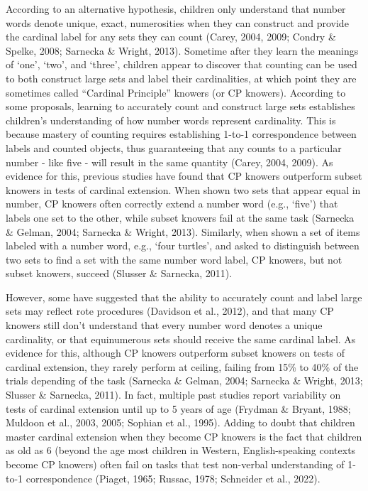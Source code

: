 \documentclass[10pt, letterpaper]{article}
\begin{document}
According to an alternative hypothesis, children only understand that
number words denote unique, exact, numerosities when they can construct
and provide the cardinal label for any sets they can count (Carey, 2004,
2009; Condry \& Spelke, 2008; Sarnecka \& Wright, 2013). Sometime after
they learn the meanings of `one', `two', and `three', children appear to
discover that counting can be used to both construct large sets and
label their cardinalities, at which point they are sometimes called
``Cardinal Principle'' knowers (or CP knowers). According to some
proposals, learning to accurately count and construct large sets
establishes children's understanding of how number words represent
cardinality. This is because mastery of counting requires establishing
1-to-1 correspondence between labels and counted objects, thus
guaranteeing that any counts to a particular number - like five - will
result in the same quantity (Carey, 2004, 2009). As evidence for this,
previous studies have found that CP knowers outperform subset knowers in
tests of cardinal extension. When shown two sets that appear equal in
number, CP knowers often correctly extend a number word (e.g., `five')
that labels one set to the other, while subset knowers fail at the same
task (Sarnecka \& Gelman, 2004; Sarnecka \& Wright, 2013). Similarly,
when shown a set of items labeled with a number word, e.g., `four
turtles', and asked to distinguish between two sets to find a set with
the same number word label, CP knowers, but not subset knowers, succeed
(Slusser \& Sarnecka, 2011).

However, some have suggested that the ability to accurately count and
label large sets may reflect rote procedures (Davidson et al., 2012),
and that many CP knowers still don't understand that every number word
denotes a unique cardinality, or that equinumerous sets should receive
the same cardinal label. As evidence for this, although CP knowers
outperform subset knowers on tests of cardinal extension, they rarely
perform at ceiling, failing from 15\% to 40\% of the trials depending of
the task (Sarnecka \& Gelman, 2004; Sarnecka \& Wright, 2013; Slusser \&
Sarnecka, 2011). In fact, multiple past studies report variability on
tests of cardinal extension until up to 5 years of age (Frydman \&
Bryant, 1988; Muldoon et al., 2003, 2005; Sophian et al., 1995). Adding
to doubt that children master cardinal extension when they become CP
knowers is the fact that children as old as 6 (beyond the age most
children in Western, English-speaking contexts become CP knowers) often
fail on tasks that test non-verbal understanding of 1-to-1
correspondence (Piaget, 1965; Russac, 1978; Schneider et al., 2022).
\end{document}
